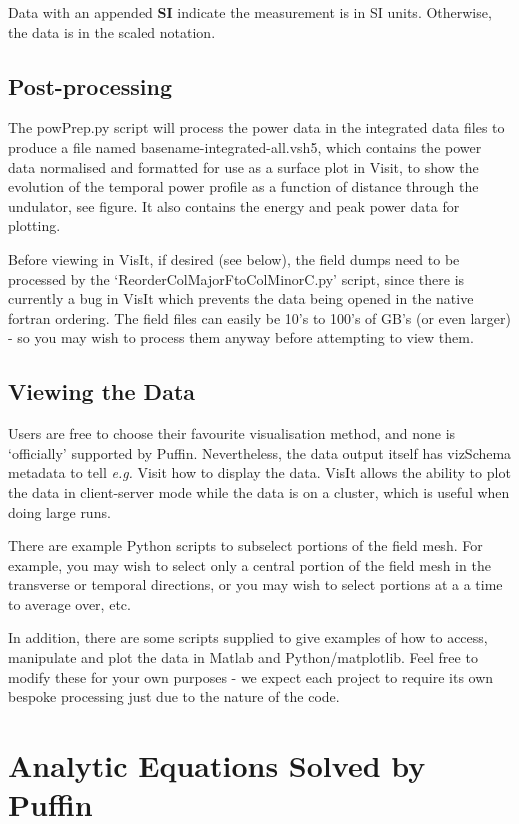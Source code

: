 \documentclass[12pt]{article}%
\begin{document}
Data with an appended {\bf SI} indicate the measurement is in SI units. Otherwise, the data is in the scaled notation.

\subsection{Post-processing}

The powPrep.py script will process the power data in the integrated data files to produce a file named basename-integrated-all.vsh5, which contains the power data normalised and formatted for use as a surface plot in Visit, to show the evolution of the temporal power profile as a function of distance through the undulator, see figure. It also contains the energy and peak power data for plotting.

Before viewing in VisIt, if desired (see below), the field dumps need to be processed by the `ReorderColMajorFtoColMinorC.py' script, since there is currently a bug in VisIt which prevents the data being opened in the native fortran ordering. The field files can easily be 10's to 100's of GB's (or even larger) - so you may wish to process them anyway before attempting to view them.

\subsection{Viewing the Data}

Users are free to choose their favourite visualisation method, and none is `officially' supported by Puffin. Nevertheless, the data output itself has vizSchema metadata to tell \textit{e.g.} Visit how to display the data. VisIt allows the ability to plot the data in client-server mode while the data is on a cluster, which is useful when doing large runs.

There are example Python scripts to subselect portions of the field mesh. For example, you may wish to select only a central portion of the field mesh in the transverse or temporal directions, or you may wish to select portions at a a time to average over, etc.

In addition, there are some scripts supplied to give examples of how to access, manipulate and plot the data in Matlab and Python/matplotlib. Feel free to modify these for your own purposes - we expect each project to require its own bespoke processing just due to the nature of the code.


\newpage

\section{Analytic Equations Solved by Puffin}
\end{document}
